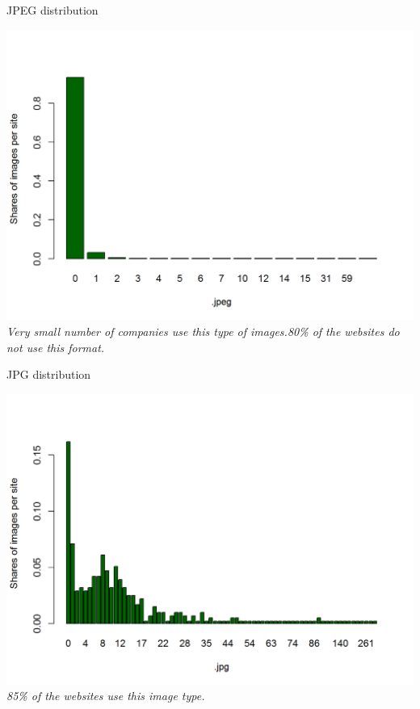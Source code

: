 \documentclass{book}
\begin{document}
\begin{table}[H]
\centering
\caption{JPEG distribution}
\begin{center}
\includegraphics[scale=0.4]{../R/photos/58_jpeg_dist.png}    \\
\textit{Very small number of companies use this type of images.80\% of the websites do not use this format.}
\end{center}
\end{table}
\begin{table}[H]
\centering
\caption{JPG distribution}
\begin{center}
\includegraphics[scale=0.4]{../R/photos/59_jpg_dist.png}    \\
\textit{85\% of the websites use this image type.}
\end{center}
\end{table}
\end{document}
